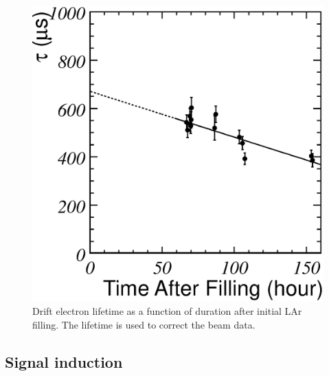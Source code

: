 
\begin{figure}[htbp]
 \begin{center}
  \includegraphics[width=1.0\hsize]{fig/tauHistory.eps}
 \end{center}
 \caption{Drift electron lifetime as a function of duration after initial LAr filling. The lifetime is used to correct the beam data.}
 \label{fig:CosmicPurity}
\end{figure}

\subsection{Signal induction}

